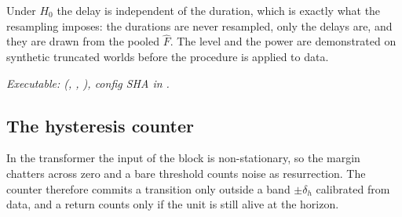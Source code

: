 \documentclass[11pt]{article}
\theoremstyle{definition}
\theoremstyle{remark}
\begin{document}
\noindent Under $H_0$ the delay is independent of the duration, which is exactly
what the resampling imposes: the durations are never resampled, only the delays
are, and they are drawn from the pooled $\hat F$. The level and the power are
demonstrated on synthetic truncated worlds before the procedure is applied to
data.

\noindent\textit{Executable: 
(, , ), config SHA in
.}

\subsection{The hysteresis counter}\label{app:alg3}

In the transformer the input of the block is non-stationary, so the margin
chatters across zero and a bare threshold counts noise as resurrection. The
counter therefore commits a transition only outside a band $\pm\delta_h$
calibrated from data, and a return counts only if the unit is still alive at the
horizon.
\end{document}
